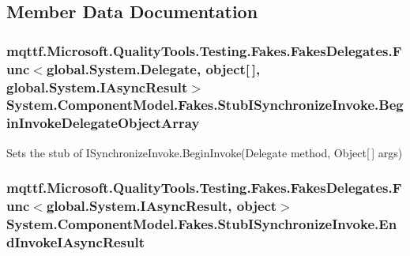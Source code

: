 \subsection{Member Data Documentation}
\hypertarget{class_system_1_1_component_model_1_1_fakes_1_1_stub_i_synchronize_invoke_a755e69064ede837ad41cec615b90ea1f}{
\subsubsection[{Begin\-Invoke\-Delegate\-Object\-Array}]{\setlength{\rightskip}{0pt plus 5cm}mqttf.\-Microsoft.\-Quality\-Tools.\-Testing.\-Fakes.\-Fakes\-Delegates.\-Func$<$global.\-System.\-Delegate, object\mbox{[}$\,$\mbox{]}, global.\-System.\-I\-Async\-Result$>$ System.\-Component\-Model.\-Fakes.\-Stub\-I\-Synchronize\-Invoke.\-Begin\-Invoke\-Delegate\-Object\-Array}}\label{class_system_1_1_component_model_1_1_fakes_1_1_stub_i_synchronize_invoke_a755e69064ede837ad41cec615b90ea1f}


Sets the stub of I\-Synchronize\-Invoke.\-Begin\-Invoke(\-Delegate method, Object\mbox{[}$\,$\mbox{]} args)

\hypertarget{class_system_1_1_component_model_1_1_fakes_1_1_stub_i_synchronize_invoke_a8367484e36638b43ac6f169ab5cdc4ae}{
\subsubsection[{End\-Invoke\-I\-Async\-Result}]{\setlength{\rightskip}{0pt plus 5cm}mqttf.\-Microsoft.\-Quality\-Tools.\-Testing.\-Fakes.\-Fakes\-Delegates.\-Func$<$global.\-System.\-I\-Async\-Result, object$>$ System.\-Component\-Model.\-Fakes.\-Stub\-I\-Synchronize\-Invoke.\-End\-Invoke\-I\-Async\-Result}}\label{class_system_1_1_component_model_1_1_fakes_1_1_stub_i_synchronize_invoke_a8367484e36638b43ac6f169ab5cdc4ae}


